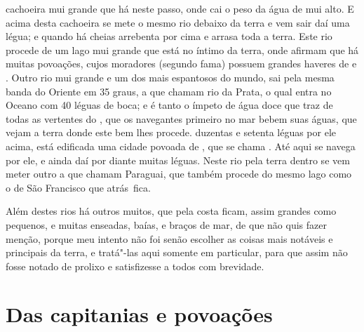 cachoeira mui grande que há neste passo, onde cai o peso da água de mui
alto. E acima desta cachoeira se mete o mesmo rio debaixo da terra e
vem sair daí uma légua; e quando há cheias arrebenta por cima e arrasa
toda a terra. Este rio procede de um lago mui grande que está no íntimo
da terra, onde afirmam que há muitas povoações, cujos moradores
(segundo fama) possuem grandes haveres de  e . Outro rio
mui grande e um dos mais espantosos do mundo, sai pela mesma banda do
Oriente em 35 graus, a que chamam rio da Prata, o qual					%
entra no Oceano com 40 léguas de boca; e é tanto o ímpeto de água
doce que traz de todas as vertentes do , que os navegantes primeiro no mar
bebem suas águas, que vejam a terra donde este bem lhes procede.
duzentas e setenta léguas por ele acima, está edificada uma cidade
povoada de , que se chama .  Até aqui se navega por
ele, e ainda daí  por diante muitas léguas. Neste rio pela terra dentro
se vem meter outro a que chamam Paraguai, que também procede do mesmo			%
lago como o de São Francisco que \mbox{atrás fica.}

Além destes rios há outros muitos, que pela costa ficam, assim grandes
como pequenos, e muitas enseadas, baías, e braços de mar, de que não
quis fazer menção, porque meu intento não foi senão escolher as coisas
mais notáveis e principais da terra, e tratá"-las aqui somente em
particular, para que assim não fosse notado de prolixo e satisfizesse a
todos com brevidade.									

\chapter[Das \indice{capitanias} e povoações]{Das capitanias e
povoações}

